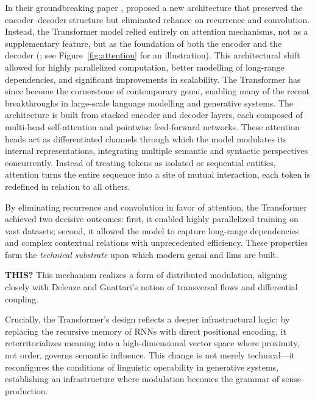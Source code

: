 In their groundbreaking paper , \textcite{vaswani2017a} proposed a new architecture that preserved the encoder–decoder structure but eliminated reliance on recurrence and convolution. Instead, the Transformer model relied entirely on attention mechanisms, not as a supplementary feature, but as the foundation of both the encoder and the decoder (\cite[1–2]{vaswani2017a}; see Figure~\ref{fig:attention} for an illustration). This architectural shift allowed for highly parallelized computation, better modelling of long-range dependencies, and significant improvements in scalability. The Transformer has since become the cornerstone of contemporary \gls{genai}, enabling many of the recent breakthroughs in large-scale language modelling and generative systems. The architecture is built from stacked encoder and decoder layers, each composed of multi-head self-attention and pointwise feed-forward networks. These attention heads act as differentiated channels through which the model modulates its internal representations, integrating multiple semantic and syntactic perspectives concurrently. Instead of treating \glspl{token} as isolated or sequential entities, attention turns the entire sequence into a site of mutual interaction, each token is redefined in relation to all others.

By eliminating recurrence and convolution in favor of attention, the Transformer
achieved two decisive outcomes: first, it enabled highly parallelized training
on vast datasets; second, it allowed the model to capture long-range
dependencies and complex contextual relations with unprecedented efficiency.
These properties form the \emph{technical substrate} upon which modern
\gls{genai} and \glspl{llm} are built.



\begin{orangebox}
	\textbf{THIS?}
	This mechanism realizes a form of distributed modulation, aligning closely with Deleuze and Guattari’s notion of transversal flows and differential coupling.


	Crucially, the Transformer’s design reflects a deeper infrastructural logic: by replacing the recursive memory of RNNs with direct positional encoding, it reterritorializes meaning into a high-dimensional vector space where proximity, not order, governs semantic influence. This change is not merely technical—it reconfigures the conditions of linguistic operability in generative systems, establishing an infrastructure where modulation becomes the grammar of sense-production.
\end{orangebox}





